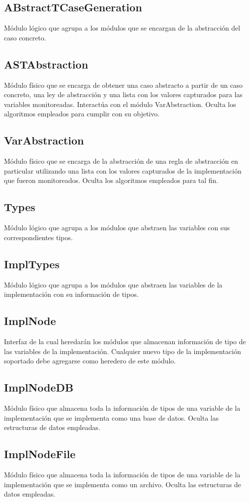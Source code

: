 \documentclass[a4paper,10pt]{report}
\begin{document}
		\subsection{ABstractTCaseGeneration}
		Módulo lógico que agrupa a los módulos que se encargan de la abstracción del caso concreto.
			\subsection{ASTAbstraction}
			Módulo físico que se encarga de obtener una caso abstracto a partir de un caso concreto, una ley de abstracción y una lista con los valores capturados para las variables monitoreadas. Interactúa con el módulo VarAbstraction. Oculta los algoritmos empleados para cumplir con su objetivo.
			\subsection{VarAbstraction}
			Módulo físico que se encarga de la abstracción de una regla de abstracción en particular utilizando una lista con los valores capturados de la implementación que fueron monitoreados. Oculta los algoritmos empleados para tal fin.
		\subsection{Types}
		Módulo lógico que agrupa a los módulos que abstraen las variables  con sus correspondientes tipos.
			\subsection{ImplTypes}
			Módulo lógico que agrupa a los módulos que abstraen las variables de la implementación con su información de tipos.
				\subsection{ImplNode}
				Interfaz de la cual heredarán los módulos que almacenan información de tipo de las variables de la implementación. Cualquier nuevo tipo de la implementación soportado debe agregarse como heredero de este módulo.
				\subsection{ImplNodeDB}
				Módulo físico que almacena toda la información de tipos de una variable de la implementación que se implementa como una base de datos. Oculta las estructuras de datos empleadas.
				\subsection{ImplNodeFile}
				Módulo físico que almacena toda la información de tipos de una variable de la implementación que se implementa como un archivo. Oculta las estructuras de datos empleadas.
\end{document}
